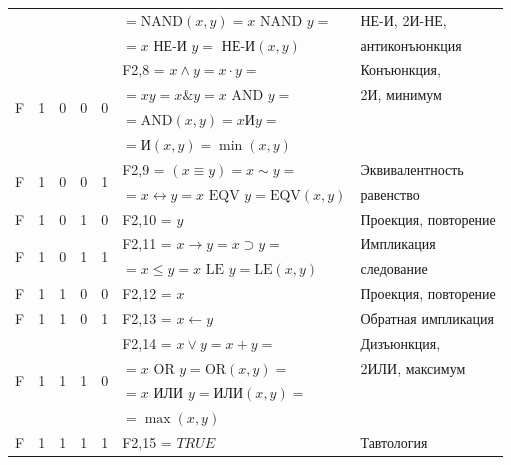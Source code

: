\begin{table}[!h]
\begin{tabular}{|c|c|c|c|c|p{4.5cm}|p{4.5cm}|}
& & & & & $= \text{NAND}(x,y) = x \text{ NAND } y = $ & НЕ-И, 2И-НЕ, \\
& & & & & $= x $ НЕ-И $y = $ НЕ-И$(x,y)$ & антиконъюнкция \\
\hline
\multirow{4}{*}{F} & \multirow{4}{*}{1} & \multirow{4}{*}{0} & \multirow{4}{*}{0} & \multirow{4}{*}{0} & F2,8 = $x \wedge y = x \cdot y = $ & Конъюнкция, \\
& & & & & $= xy = x \& y = x \text{ AND } y = $ & 2И, минимум \\
& & & & & $= \text{AND}(x,y) = x $И$ y = $ & \\
& & & & & $= \text{И}(x,y) = \min(x,y)$ & \\
\hline
\multirow{2}{*}{F} & \multirow{2}{*}{1} & \multirow{2}{*}{0} & \multirow{2}{*}{0} & \multirow{2}{*}{1} & F2,9 = $(x \equiv y) = x \sim y = $ & Эквивалентность \\
& & & & & $= x \leftrightarrow y = x \text{ EQV } y = \text{EQV}(x,y)$ & равенство \\
\hline
F & 1 & 0 & 1 & 0 & F2,10 = $y $ & Проекция, повторение \\
\hline
\multirow{2}{*}{F} & \multirow{2}{*}{1} & \multirow{2}{*}{0} & \multirow{2}{*}{1} & \multirow{2}{*}{1} & F2,11 = $x \to y = x \supset y = $ & Импликация \\
& & & & & $= x \le y = x \text{ LE } y = \text{LE}(x,y)$ & следование \\
\hline
F & 1 & 1 & 0 & 0 & F2,12 = $x $ & Проекция, повторение \\
\hline
F & 1 & 1 & 0 & 1 & F2,13 = $x \leftarrow y $ & Обратная импликация \\
\hline
\multirow{4}{*}{F} & \multirow{4}{*}{1} & \multirow{4}{*}{1} & \multirow{4}{*}{1} & \multirow{4}{*}{0} & F2,14 = $x \vee y = x + y = $ & Дизъюнкция, \\
& & & & & $= x \text{ OR } y = \text{OR}(x,y) = $ & 2ИЛИ, максимум \\
& & & & & $= x$ ИЛИ $y = \text{ИЛИ}(x,y) = $ & \\
& & & & & $= \max(x,y)$ & \\
\hline
F & 1 & 1 & 1 & 1 & F2,15 = $TRUE $ & Тавтология \\
\hline
\end{tabular}

\end{table}
